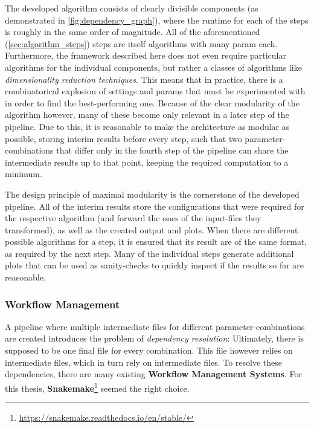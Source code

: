 The developed algorithm consists of clearly divisible components (as demonstrated in \autoref{fig:dependency_graph}), where the runtime for each of the steps is roughly in the same order of magnitude. All of the aforementioned (\autoref{sec:algorithm_steps}) steps are itself algorithms with many \gls{param} each. Furthermore, the framework described here does not even require particular algorithms for the individual components, but rather a classes of algorithms like \emph{dimensionality reduction techniques}. This means that in practice, there is a combinatorical explosion of settings and \glspl{param} that must be experimented with in order to find the best-performing one. Because of the clear modularity of the algorithm however, many of these become only relevant in a later step of the pipeline. Due to this, it is reasonable to make the architecture as modular as possible, storing interim results before every step, such that two parameter-combinations that differ only in \eg the fourth step of the pipeline can share the intermediate results up to that point, keeping the required computation to a minimum. 

The design principle of maximal modularity is the cornerstone of the developed pipeline. All of the interim results store the configurations that were required for the respective algorithm (and forward the ones of the input-files they transformed), as well as the created output and plots. When there are different possible algorithms for a step, it is ensured that its result are of the same format, as required by the next step. Many of the individual steps generate additional plots that can be used as sanity-checks to quickly inspect if the results so far are reasonable.

\subsubsection{Workflow Management}

A pipeline where multiple intermediate files for different parameter-combinations are created introduces the problem of \emph{dependency resolution}: Ultimately, there is supposed to be one final file for every combination. This file however relies on intermediate files, which in turn rely on intermediate files. To resolve these dependencies, there are many existing \textbf{Workflow Management Systems}. For this thesis, \textbf{Snakemake}\footnote{\url{https://snakemake.readthedocs.io/en/stable/}} \cite{Molder2021a} seemed the right choice.

